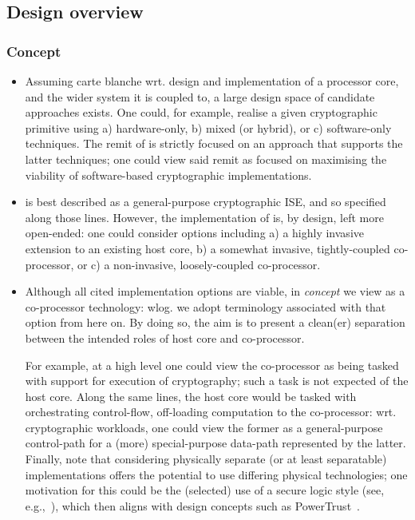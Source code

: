 
\subsection{Design overview}
\label{sec:bg:design}


\subsubsection{Concept}

\begin{itemize}

\item Assuming carte blanche wrt. design and implementation of a processor 
      core, and the wider system it is coupled to, a large design space of 
      candidate approaches exists.  One could, for example, realise a given 
      cryptographic primitive using
      a) hardware-only,
      b) mixed (or hybrid),
         or
      c) software-only
      techniques.
      The remit of \XCID is strictly focused on an approach that supports the
      latter techniques; one could view said remit as focused on maximising
      the viability of software-based cryptographic implementations.

\item \XCID is best described as a general-purpose cryptographic ISE, and so
      specified along those lines.  However, the implementation of \XCID is,
      by design, left more open-ended: one could consider options including
      a) a highly   invasive extension to an existing host core,
      b) a somewhat invasive, tightly-coupled co-processor,
         or
      c) a      non-invasive, loosely-coupled co-processor.

\item Although all cited implementation options are viable, in {\em concept}
      we view \XCID as a co-processor technology: wlog. we adopt terminology 
      associated with that option from here on.  By doing so, the aim is to 
      present a clean(er) separation between the intended roles of host core 
      and \XCID co-processor.

      For example, at a high level one could view the co-processor as being 
      tasked with support for execution of cryptography; such a task is not
      expected of the host core.  Along the same lines, the host core would
      be tasked with orchestrating control-flow, off-loading computation to
      the co-processor: wrt. cryptographic workloads, one could view the
      former as a general-purpose control-path for a (more) special-purpose 
      data-path represented by the latter.  Finally, note that considering
      physically separate (or at least separatable) implementations offers
      the potential to use differing physical technologies; one motivation
      for this could be the (selected) use of a secure logic style (see, 
      e.g.,~\cite{SCARV:MayMur:16}), which then aligns with design concepts 
      such as PowerTrust~\cite{SCARV:TilKirSze:10}.


\end{itemize}
